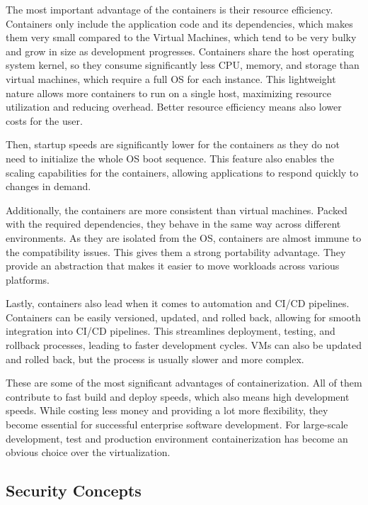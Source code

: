 The most important advantage of the containers is their resource efficiency. Containers only include the application code and its dependencies, which makes them very small compared to the Virtual Machines, which tend to be very bulky and grow in size as development progresses. Containers share the host operating system kernel, so they consume significantly less CPU, memory, and storage than virtual machines, which require a full OS for each instance. This lightweight nature allows more containers to run on a single host, maximizing resource utilization and reducing overhead. Better resource efficiency means also lower costs for the user.

Then, startup speeds are significantly lower for the containers as they do not need to initialize the whole OS boot sequence. This feature also enables the scaling capabilities for the containers, allowing applications to respond quickly to changes in demand.

Additionally, the containers are more consistent than virtual machines. Packed with the required dependencies, they behave in the same way across different environments. As they are isolated from the OS, containers are almost immune to the compatibility issues. This gives them a strong portability advantage. They provide an abstraction that makes it easier to move workloads across various platforms.

Lastly, containers also lead when it comes to automation and CI/CD pipelines. Containers can be easily versioned, updated, and rolled back, allowing for smooth integration into CI/CD pipelines. This streamlines deployment, testing, and rollback processes, leading to faster development cycles. VMs can also be updated and rolled back, but the process is usually slower and more complex.

These are some of the most significant advantages of containerization. All of them contribute to fast build and deploy speeds, which also means high development speeds. While costing less money and providing a lot more flexibility, they become essential for successful enterprise software development. For large-scale development, test and production environment containerization has become an obvious choice over the virtualization.

\subsection{Security Concepts}